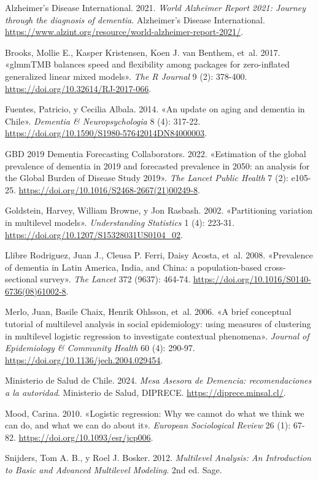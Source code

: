 \documentclass[
  spanish,
  letterpaper,
  DIV=11,
  numbers=noendperiod]{scrartcl}
\newlength{\cslhangindent}
\newenvironment{CSLReferences}[2] %
 {\begin{list}{}{%
  \setlength{\itemindent}{0pt}
  \setlength{\leftmargin}{0pt}
  \setlength{\parsep}{0pt}
  \ifodd #1
   \setlength{\leftmargin}{\cslhangindent}
   \setlength{\itemindent}{-1\cslhangindent}
  \fi
  \setlength{\itemsep}{#2\baselineskip}}}
 {\end{list}}
\begin{document}
\protect{}\label{refs}
\begin{CSLReferences}{1}{1}
Alzheimer's Disease International. 2021. \emph{World Alzheimer Report
2021: Journey through the diagnosis of dementia}. Alzheimer's Disease
International.
\url{https://www.alzint.org/resource/world-alzheimer-report-2021/}.

{Brooks, Mollie E., Kasper Kristensen, Koen J. van Benthem, et~al.}
2017. {«glmmTMB balances speed and flexibility among packages for
zero-inflated generalized linear mixed models»}. \emph{The R Journal} 9
(2): 378-400. \url{https://doi.org/10.32614/RJ-2017-066}.

Fuentes, Patricio, y Cecilia Albala. 2014. {«An update on aging and
dementia in Chile»}. \emph{Dementia \& Neuropsychologia} 8 (4): 317-22.
\url{https://doi.org/10.1590/S1980-57642014DN84000003}.

GBD 2019 Dementia Forecasting Collaborators. 2022. {«Estimation of the
global prevalence of dementia in 2019 and forecasted prevalence in 2050:
an analysis for the Global Burden of Disease Study 2019»}. \emph{The
Lancet Public Health} 7 (2): e105-25.
\url{https://doi.org/10.1016/S2468-2667(21)00249-8}.

Goldstein, Harvey, William Browne, y Jon Rasbash. 2002. {«Partitioning
variation in multilevel models»}. \emph{Understanding Statistics} 1 (4):
223-31. \url{https://doi.org/10.1207/S15328031US0104_02}.

{Llibre Rodriguez, Juan J., Cleusa P. Ferri, Daisy Acosta, et~al.} 2008.
{«Prevalence of dementia in Latin America, India, and China: a
population-based cross-sectional survey»}. \emph{The Lancet} 372 (9637):
464-74. \url{https://doi.org/10.1016/S0140-6736(08)61002-8}.

{Merlo, Juan, Basile Chaix, Henrik Ohlsson, et~al.} 2006. {«A brief
conceptual tutorial of multilevel analysis in social epidemiology: using
measures of clustering in multilevel logistic regression to investigate
contextual phenomena»}. \emph{Journal of Epidemiology \& Community
Health} 60 (4): 290-97. \url{https://doi.org/10.1136/jech.2004.029454}.

Ministerio de Salud de Chile. 2024. \emph{Mesa Asesora de Demencia:
recomendaciones a la autoridad}. Ministerio de Salud, DIPRECE.
\url{https://diprece.minsal.cl/}.

Mood, Carina. 2010. {«Logistic regression: Why we cannot do what we
think we can do, and what we can do about it»}. \emph{European
Sociological Review} 26 (1): 67-82.
\url{https://doi.org/10.1093/esr/jcp006}.

Snijders, Tom A. B., y Roel J. Bosker. 2012. \emph{Multilevel Analysis:
An Introduction to Basic and Advanced Multilevel Modeling}. 2nd ed.
Sage.

\end{CSLReferences}
\end{document}
